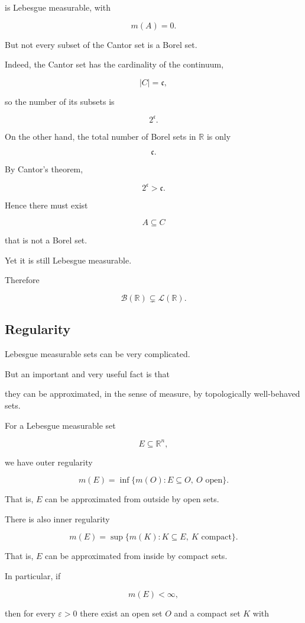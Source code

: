 \documentclass[11pt]{article}
\begin{document}
is Lebesgue measurable, with

\[
m(A)=0.
\]

But not every subset of the Cantor set is a Borel set.

Indeed, the Cantor set has the cardinality of the continuum,

\[
|C|=\mathfrak{c},
\]

so the number of its subsets is

\[
2^{\mathfrak{c}}.
\]

On the other hand, the total number of Borel sets in $\mathbb{R}$ is only

\[
\mathfrak{c}.
\]

By Cantor's theorem,

\[
2^{\mathfrak{c}}>\mathfrak{c}.
\]

Hence there must exist

\[
A\subseteq C
\]

that is not a Borel set.

Yet it is still Lebesgue measurable.

Therefore

\[
\mathcal{B}(\mathbb{R})\subsetneq\mathcal{L}(\mathbb{R}).
\]

\subsection{Regularity}

Lebesgue measurable sets can be very complicated.

But an important and very useful fact is that

they can be approximated, in the sense of measure, by topologically well-behaved sets.

For a Lebesgue measurable set

\[
E\subseteq\mathbb{R}^{n},
\]

we have outer regularity

\[
m(E)=\inf\{m(O):E\subseteq O,\ O\text{ open}\}.
\]

That is, $E$ can be approximated from outside by open sets.

There is also inner regularity

\[
m(E)=\sup\{m(K):K\subseteq E,\ K\text{ compact}\}.
\]

That is, $E$ can be approximated from inside by compact sets.

In particular, if

\[
m(E)<\infty,
\]

then for every $\varepsilon>0$ there exist an open set $O$ and a compact set $K$ with
\end{document}
